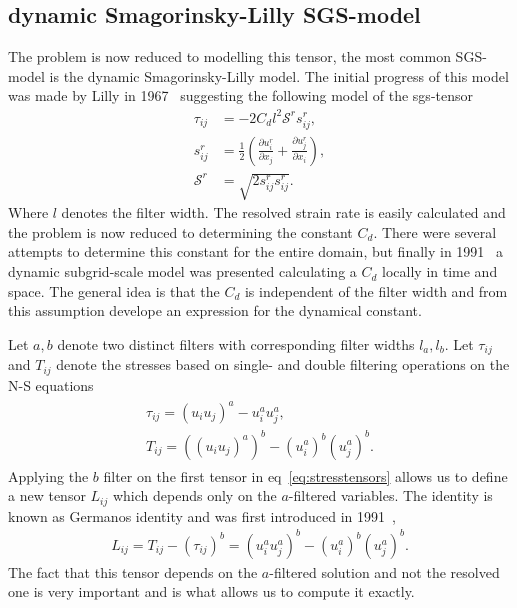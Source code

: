 \subsection{dynamic Smagorinsky-Lilly SGS-model}
The problem is now reduced to modelling this tensor, the most common SGS-model is the 
dynamic Smagorinsky-Lilly model. The initial progress of this model was made by 
Lilly in 1967~\cite{Lilly67} suggesting the following model of the sgs-tensor
%
\begin{align}
    \tau_{ij} &= -2C_dl^2\mathcal{S}^rs_{ij}^r,\\
    s^r_{ij} &= \frac{1}{2}\left( \frac{\partial u^r_i}{\partial x_j} +
    \frac{\partial u^r_j}{\partial x_i}\right),\\
    \mathcal{S}^r &= \sqrt{2s^r_{ij}s^r_{ij}}.
    \label{eq:boussinesq}
\end{align}
%
Where $l$ denotes the filter width.
The resolved strain rate is easily calculated and the problem is now reduced to determining
the constant $C_d$. There were several attempts to determine this constant for the entire domain,
but finally in 1991~\cite{Germano91} a dynamic subgrid-scale model was presented calculating a 
$C_d$ locally in time and space. The general idea is that the $C_d$ is independent of the 
filter width and from this assumption develope an expression for the dynamical constant.

Let $a,b$ denote two distinct filters with corresponding filter widths $l_a,l_b$. 
Let $\tau_{ij}$ and $T_{ij}$ denote the stresses based on single- and double filtering
operations on the N-S equations
\begin{align}
    \begin{split}
    \tau_{ij} = (u_iu_j)^a - u_i^au_j^a,\\
    T_{ij} = ((u_iu_j)^a)^b - (u_i^a)^b(u_j^a)^b.
    \end{split}
    \label{eq:stresstensors}
\end{align}
Applying the $b$ filter on the first tensor in eq~\ref{eq:stresstensors} allows us to define 
a new tensor $L_{ij}$ which depends only on the $a$-filtered variables. The identity 
is known as Germanos identity and was first introduced in 1991~\cite{Germano91},
\begin{align}
    L_{ij} = T_{ij} - (\tau_{ij})^b
    = (u_i^au_j^a)^b - (u_i^a)^b(u_j^a)^b.
    \label{eq:germanoid}
\end{align}
The fact that this tensor depends on the $a$-filtered solution and not the resolved 
one is very important and is what allows us to compute it exactly.

